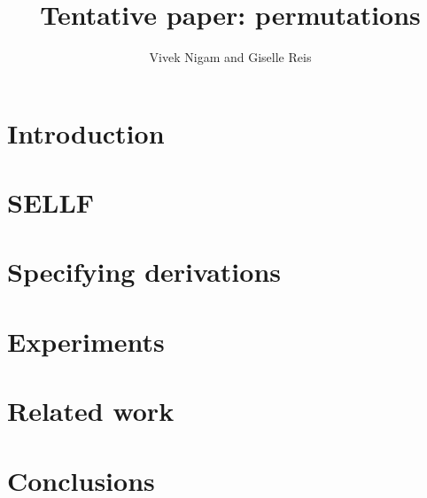 \documentclass[a4paper, 11pt]{llncs}
\title{Tentative paper: permutations}
\author{Vivek Nigam and Giselle Reis}
\begin{document}
\maketitle

\begin{abstract}

\end{abstract}

\section{Introduction}


\section{SELLF}



\section{Specifying derivations}




\section{Experiments}


\section{Related work}


\section{Conclusions}


\appendix



\end{document}

